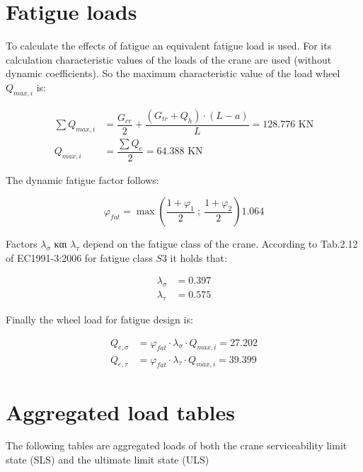 \documentclass[a4paper,10pt, final, oneside, fleqn, onecolumn]{article}	%
\begin{document}
\section{Fatigue loads}

To calculate the effects of fatigue an equivalent fatigue load is used. For its  
calculation  characteristic values of the loads of the crane are used (without 
dynamic coefficients). So the maximum characteristic value of the load wheel $Q_{max,i}$ 
is:

\begin{align*}
    \sum{Q_{max,i}} &= \dfrac{G_{cr}}{2} + \dfrac{(G_{tr} + Q_h) \cdot (L - a)}{L} = 128.776 \text{ KN} \\
    Q_{max,i}       &= \dfrac{\displaystyle\sum{Q_e}}{2}                           = 64.388  \text{ KN}
\end{align*}

The dynamic fatigue factor follows:

\begin{equation*}
    φ_{fat} = \max \left( \dfrac{1+φ_1}{2}\ ; \ \dfrac{1+φ_2}{2} \right) 1.064
\end{equation*}

Factors $λ_σ$ και $λ_τ$ depend on the fatigue class of the crane. According to 
Tab.2.12 of EC1991-3:2006 for fatigue class $S3$ it holds that:

\begin{align*}
    λ_σ &= 0.397\\
    λ_τ &= 0.575
\end{align*}

Finally the wheel load for fatigue design is:

\begin{align*}
    Q_{e,σ} &= φ_{fat} \cdot λ_σ \cdot Q_{max,i} = 27.202\\
    Q_{e,τ} &= φ_{fat} \cdot λ_τ \cdot Q_{max,i} = 39.399
\end{align*}

\section{Aggregated load tables}

The following tables are aggregated loads of both the crane 
serviceability limit state (SLS) and the ultimate limit state (ULS)
\end{document}
